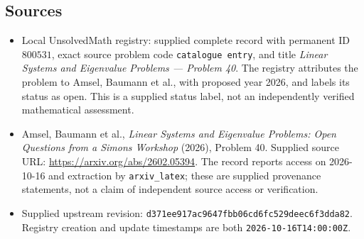 \documentclass[11pt]{article}
\begin{document}
\subsection{Sources}
\begin{itemize}
\item Local UnsolvedMath registry: supplied complete record with permanent ID \(800531\), exact source problem code \texttt{catalogue entry}, and title \emph{Linear Systems and Eigenvalue Problems --- Problem 40}. The registry attributes the problem to Amsel, Baumann et al., with proposed year 2026, and labels its status as open. This is a supplied status label, not an independently verified mathematical assessment.
\item Amsel, Baumann et al., \emph{Linear Systems and Eigenvalue Problems: Open Questions from a Simons Workshop} (2026), Problem 40. Supplied source URL: \url{https://arxiv.org/abs/2602.05394}. The record reports access on 2026-10-16 and extraction by \texttt{arxiv\_latex}; these are supplied provenance statements, not a claim of independent source access or verification.
\item Supplied upstream revision: \texttt{d371ee917ac9647fbb06cd6fc529deec6f3dda82}. Registry creation and update timestamps are both \texttt{2026-10-16T14:00:00Z}.
\end{itemize}
\end{document}
